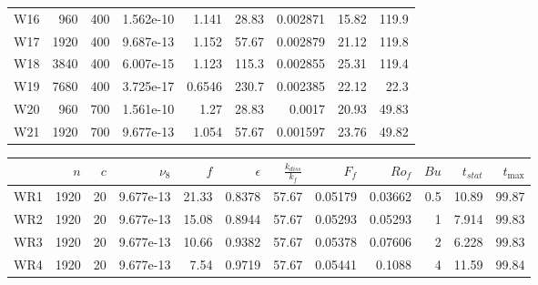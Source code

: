 \documentclass[a4paper]{article}
\begin{document}
\begin{tabular}{lrrrrrrrr}
W16 &   960 &  400 & 1.562e-10 &       1.141 &                   28.83 & 0.002871 &       15.82 &       119.9 \\
W17 &  1920 &  400 & 9.687e-13 &       1.152 &                   57.67 & 0.002879 &       21.12 &       119.8 \\
W18 &  3840 &  400 & 6.007e-15 &       1.123 &                   115.3 & 0.002855 &       25.31 &       119.4 \\
W19 &  7680 &  400 & 3.725e-17 &      0.6546 &                   230.7 & 0.002385 &       22.12 &        22.3 \\
W20 &   960 &  700 & 1.561e-10 &        1.27 &                   28.83 &   0.0017 &       20.93 &       49.83 \\
W21 &  1920 &  700 & 9.677e-13 &       1.054 &                   57.67 & 0.001597 &       23.76 &       49.82 \\
\bottomrule
\end{tabular}
\begin{tabular}{lrrrrrrrrrrr}
\toprule
{} &   $n$ &  $c$ &   $\nu_8$ &   $f$ &  $\epsilon$ &  $\frac{k_{diss}}{k_f}$ &   $F_f$ &  $Ro_f$ &  $Bu$ &  $t_{stat}$ &  $t_{\max}$ \\
\midrule
WR1 &  1920 &   20 & 9.677e-13 & 21.33 &      0.8378 &                   57.67 & 0.05179 & 0.03662 &   0.5 &       10.89 &       99.87 \\
WR2 &  1920 &   20 & 9.677e-13 & 15.08 &      0.8944 &                   57.67 & 0.05293 & 0.05293 &     1 &       7.914 &       99.83 \\
WR3 &  1920 &   20 & 9.677e-13 & 10.66 &      0.9382 &                   57.67 & 0.05378 & 0.07606 &     2 &       6.228 &       99.83 \\
WR4 &  1920 &   20 & 9.677e-13 &  7.54 &      0.9719 &                   57.67 & 0.05441 &  0.1088 &     4 &       11.59 &       99.84 \\
\bottomrule
\end{tabular}
\end{document}

